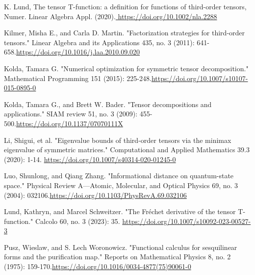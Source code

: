 \documentclass[oupthm]{CUP-JNL-BCM}%
\theoremstyle{oupplain}
\theoremstyle{oupdefinition}
\theoremstyle{oupremark}
\theoremstyle{oupproof}
\numberwithin{equation}{section}
\begin{document}
\begin{Backmatter}
\begin{thebibliography}{}
K. Lund, The tensor T-function: a definition for functions of third-order tensors, Numer. Linear
Algebra Appl. (2020).\url{ https://doi.org/10.1002/nla.2288}

Kilmer, Misha E., and Carla D. Martin. "Factorization strategies for third-order tensors." Linear Algebra and its Applications 435, no. 3 (2011): 641-658.\url{https://doi.org/10.1016/j.laa.2010.09.020}

Kolda, Tamara G. "Numerical optimization for symmetric tensor decomposition." Mathematical Programming 151 (2015): 225-248.\url{https://doi.org/10.1007/s10107-015-0895-0}

Kolda, Tamara G., and Brett W. Bader. "Tensor decompositions and applications." SIAM review 51, no. 3 (2009): 455-500.\url{https://doi.org/10.1137/07070111X}

Li, Shigui, et al. "Eigenvalue bounds of third-order tensors via the minimax eigenvalue of symmetric matrices." Computational and Applied Mathematics 39.3 (2020): 1-14. \url{https://doi.org/10.1007/s40314-020-01245-0}

Luo, Shunlong, and Qiang Zhang. "Informational distance on quantum-state space." Physical Review A—Atomic, Molecular, and Optical Physics 69, no. 3 (2004): 032106.\url{https://doi.org/10.1103/PhysRevA.69.032106}

Lund, Kathryn, and Marcel Schweitzer. "The Fréchet derivative of the tensor T-function." Calcolo 60, no. 3 (2023): 35. \url{https://doi.org/10.1007/s10092-023-00527-3}

Pusz, Wieslaw, and S. Lech Woronowicz. "Functional calculus for sesquilinear forms and the purification map." Reports on Mathematical Physics 8, no. 2 (1975): 159-170.\url{https://doi.org/10.1016/0034-4877(75)90061-0}


\end{thebibliography}

\printaddress

\end{Backmatter}
\end{document}
